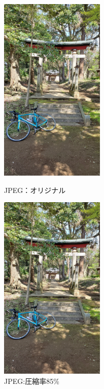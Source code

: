 \documentclass[a4paper,11pt]{bxjsarticle}
\begin{document}
  \begin{figure}[htbp]
    \begin{minipage}{0.5\hsize}
     \begin{center}
      \includegraphics[width=50mm]{sample.jpg}
     \end{center}
     \caption{JPEG：オリジナル}
     \label{fig:jori}
    \end{minipage}
    \begin{minipage}{0.5\hsize}
     \begin{center}
      \includegraphics[width=50mm]{sample_j85.jpg}
     \end{center}
     \caption{JPEG:圧縮率85\%}
     \label{fig:j85}
    \end{minipage}
   \end{figure}
\end{document}
